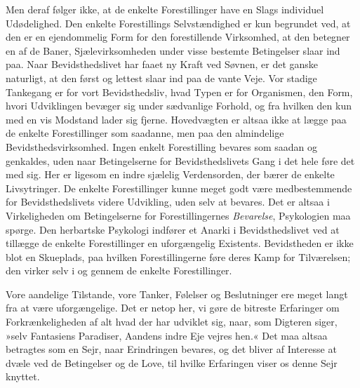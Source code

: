 \documentclass[12pt,a4paper,openany]{book}
\newcommand{\opage}[1]{\marginnote{\footnotesize\textit{[#1]}}}
\begin{document}
Men deraf følger ikke, at de enkelte Forestillinger have en Slags
individuel Udødelighed. Den enkelte Forestillings Selvstændighed er kun
begrundet ved, at den er en ejendommelig Form for den forestillende
Virksomhed, at den betegner en af de Baner, Sjælevirksomheden under
visse bestemte Betingelser slaar ind paa. Naar Bevidsthedslivet har
faaet ny Kraft ved Søvnen, er det ganske naturligt, at den først og
lettest slaar ind paa de vante Veje. Vor stadige Tankegang er for vort
Bevidsthedsliv, hvad Typen er for Organismen, den Form, hvori
Udviklingen bevæger sig under sædvanlige Forhold, og fra hvilken den kun
med en vis Modstand lader sig fjerne. Hovedvægten er altsaa ikke at
lægge paa de enkelte Forestillinger som saadanne, men paa den
almindelige Bevidsthedsvirksomhed. Ingen enkelt Forestilling bevares som
saadan og genkaldes, uden naar Betingelserne for Bevidsthedslivets Gang
i det hele føre det med sig. Her er ligesom en indre sjælelig
Verdensorden, der bærer de enkelte Livsytringer. De enkelte
Forestillinger kunne meget godt være medbestemmende for
Bevidsthedslivets videre Udvikling, uden selv at bevares. Det er altsaa
i Virkeligheden om Betingelserne for Forestillingernes \emph{Bevarelse},
Psykologien maa spørge. Den herbartske Psykologi indfører et Anarki i
Bevidsthedslivet ved at tillægge de enkelte Forestillinger en
uforgængelig Existents. Bevidstheden er ikke blot en Skueplads, paa
hvilken Forestillingerne føre deres Kamp for Tilværelsen; den virker
selv i og gennem de enkelte Forestillinger.

Vore aandelige Tilstande, vore Tanker, Følelser og Beslutninger ere
meget langt fra at være uforgængelige. Det er
\opage{176}netop her, vi gøre de bitreste Erfaringer om
Forkrænkeligheden af alt hvad der har udviklet sig, naar, som Digteren
siger, »selv Fantasiens Paradiser, Aandens indre Eje vejres hen.« Det
maa altsaa betragtes som en Sejr, naar Erindringen bevares, og det
bliver af Interesse at dvæle ved de Betingelser og de Love, til hvilke
Erfaringen viser os denne Sejr knyttet.
\end{document}
